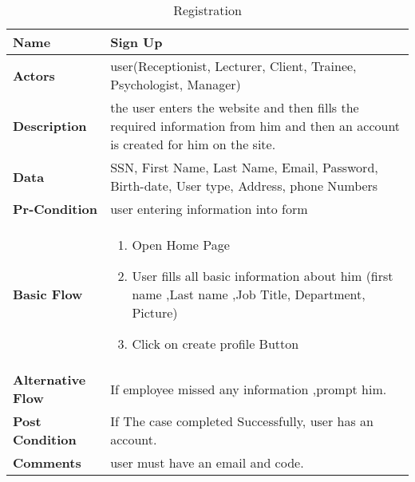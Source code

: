 \documentclass[../Psychological_system_web_application.tex]{subfiles}
\begin{document}

	\begin{center}
		\begin{table}[h]
			\begin{tabular}{ | m{4cm} | m{10cm}| } 
				\hline
			 	\textbf{\large Name}& Sign Up\\
			 	
				\hline
			  	\textbf{\large Actors}& user(Receptionist, Lecturer, Client, Trainee, Psychologist, Manager)\\ 
								
				\hline
			  	\textbf{\large Description}& the user enters the website and then fills the required information from him and then an account is created for him on the site.\\
			  	 
				\hline
				\textbf{\large Data}&SSN, First Name, Last Name, Email, Password, Birth-date, User type, Address, phone Numbers \\ 
				
				\hline
				 \textbf{\large Pr-Condition}&user entering information into form \\
				
				\hline
				\textbf{\large Basic Flow}&\begin{enumerate}
				\item
					Open Home Page 
				\item
					User fills all basic information about him (first name ,Last name ,Job Title, Department, Picture)
				\item
					Click on create profile Button \end{enumerate}				 \\
				
				\hline
				\textbf{\large Alternative Flow}& If employee missed any information ,prompt him.\\ 
								
				\hline
				\textbf{\large Post Condition}& If The case completed Successfully, user has an account.\\ 
								
				\hline
				\textbf{\large Comments}& user must have  an email and code.\\ 
				\hline
			\end{tabular}
			\caption{Registration}
			\label{table:Registration}
		\end{table}
	\end{center}
\end{document}
